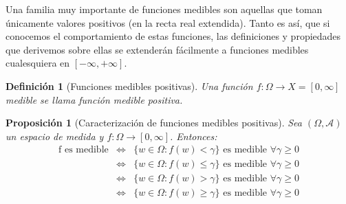 \documentclass[11pt, a4paper]{article}
\theoremstyle{theorem-style}
\newtheorem{nprop}{Proposición}[section]
\theoremstyle{definition-style}
\newtheorem{ndef}{Definición}[section]
\theoremstyle{remark-style}
\theoremstyle{example-style}
\begin{document}
Una familia muy importante de funciones medibles son aquellas que toman únicamente valores positivos (en la recta real extendida). Tanto es así, que si conocemos el comportamiento de estas funciones, las definiciones y propiedades que derivemos sobre ellas se extenderán fácilmente a funciones medibles cualesquiera en $[-\infty,+\infty]$.

\begin{ndef}[Funciones medibles positivas]
  Una función $f: \Omega \to X = [0,\infty ]$ medible se llama función medible positiva.
\end{ndef}


\begin{nprop}[Caracterización de funciones medibles positivas] \label{criterio_medibles}
  Sea $(\Omega,\mathcal{A})$ un espacio de medida y $f:\Omega \to [0,\infty]$. Entonces:
  \[
  \begin{array}{lll}
    \text{f es medible} & \iff & \{w \in \Omega : f(w) < \gamma \} \text{ es medible } \forall \gamma \geq 0\\

    & \iff & \{w \in \Omega : f(w) \leq \gamma \} \text{ es medible } \forall \gamma \geq 0\\

    & \iff & \{w \in \Omega : f(w) > \gamma \} \text{ es medible } \forall \gamma \geq 0\\

    & \iff & \{w \in \Omega : f(w) \geq \gamma \} \text{ es medible } \forall \gamma \geq 0
    \end{array}
  \]
\end{nprop}
\end{document}
